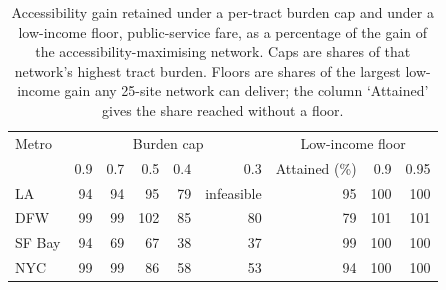 \begin{table}[!htbp]
\centering
\caption{Accessibility gain retained under a per-tract burden cap and under a low-income floor, public-service fare, as a percentage of the gain of the accessibility-maximising network. Caps are shares of that network's highest tract burden. Floors are shares of the largest low-income gain any 25-site network can deliver; the column `Attained' gives the share reached without a floor.}
\label{tab:frontiers}
\small
\begin{tabular}{lrrrrrrrr}
\toprule
Metro & \multicolumn{5}{c}{Burden cap} & \multicolumn{3}{c}{Low-income floor} \\
 & 0.9 & 0.7 & 0.5 & 0.4 & 0.3 & Attained (\%) & 0.9 & 0.95 \\
\midrule
LA & 94 & 94 & 95 & 79 & infeasible & 95 & 100 & 100 \\
DFW & 99 & 99 & 102 & 85 & 80 & 79 & 101 & 101 \\
SF Bay & 94 & 69 & 67 & 38 & 37 & 99 & 100 & 100 \\
NYC & 99 & 99 & 86 & 58 & 53 & 94 & 100 & 100 \\
\bottomrule
\end{tabular}
\end{table}
